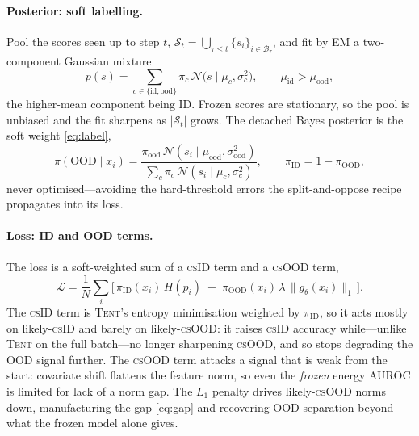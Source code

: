 \documentclass[11pt]{article}
\newcommand{\csid}{\textsc{cs}ID}
\newcommand{\csood}{\textsc{cs}OOD}
\newcommand{\g}{g_\theta}
\newcommand{\norm}[1]{\lVert #1 \rVert}
\newcommand{\method}[1]{\textsc{#1}}
\begin{document}
\paragraph{Posterior: soft labelling.} Pool the scores seen up to step $t$,
$\mathcal{S}_t=\bigcup_{\tau\le t}\{s_i\}_{i\in\mathcal{B}_\tau}$, and fit by
EM a two-component Gaussian mixture
\begin{equation}\label{eq:gmm}
p(s)=\sum_{c\in\{\mathrm{id},\mathrm{ood}\}}
\pi_c\,\mathcal{N}\!\big(s\mid\mu_c,\sigma_c^2\big),
\qquad
\mu_{\mathrm{id}}>\mu_{\mathrm{ood}} ,
\end{equation}
the higher-mean component being ID. Frozen scores are stationary, so the
pool is unbiased and the fit sharpens as $|\mathcal{S}_t|$ grows. The detached
Bayes posterior is the soft weight \eqref{eq:label},
\begin{equation}\label{eq:post}
\pi(\mathrm{OOD}\mid x_i)=
\frac{\pi_{\mathrm{ood}}\,\mathcal{N}(s_i\mid\mu_{\mathrm{ood}},\sigma_{\mathrm{ood}}^2)}
{\sum_c \pi_c\,\mathcal{N}(s_i\mid\mu_c,\sigma_c^2)},
\qquad \pi_{\mathrm{ID}}=1-\pi_{\mathrm{OOD}},
\end{equation}
never optimised---avoiding the hard-threshold errors the split-and-oppose
recipe propagates into its loss.

\paragraph{Loss: ID and OOD terms.} The loss is a soft-weighted sum of a
\csid{} term and a \csood{} term,
\begin{equation}\label{eq:loss}
\mathcal{L}=\frac{1}{N}\sum_i
\Big[\,\pi_{\text{ID}}(x_i)\,H(p_i)
\;+\;\pi_{\text{OOD}}(x_i)\,\lambda\,\norm{\g(x_i)}_1\,\Big].
\end{equation}
The \csid{} term is \method{Tent}'s entropy minimisation weighted by
$\pi_{\text{ID}}$, so it acts mostly on likely-\csid{} and barely on
likely-\csood: it raises \csid{} accuracy while---unlike \method{Tent} on the
full batch---no longer sharpening \csood, and so stops degrading the OOD
signal further. The \csood{} term attacks a signal that is weak from the
start: covariate shift flattens the feature norm, so even the \emph{frozen}
energy AUROC is limited for lack of a norm gap. The $L_1$ penalty drives
likely-\csood{} norms down, manufacturing the gap \eqref{eq:gap} and
recovering OOD separation beyond what the frozen model alone gives.
\end{document}
